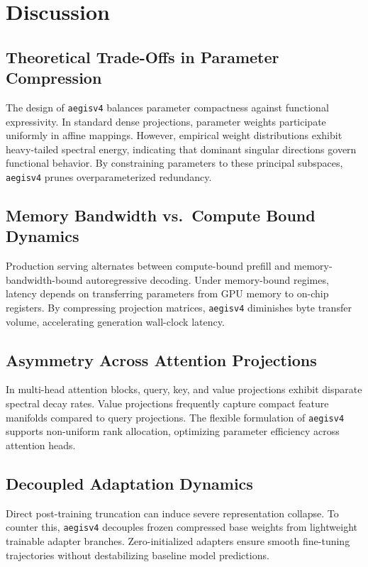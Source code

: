 \section{Discussion}

\subsection{Theoretical Trade-Offs in Parameter Compression}
The design of \texttt{aegisv4} balances parameter compactness against functional expressivity. In standard dense projections, parameter weights participate uniformly in affine mappings. However, empirical weight distributions exhibit heavy-tailed spectral energy, indicating that dominant singular directions govern functional behavior. By constraining parameters to these principal subspaces, \texttt{aegisv4} prunes overparameterized redundancy.

\subsection{Memory Bandwidth vs.\ Compute Bound Dynamics}
Production serving alternates between compute-bound prefill and memory-bandwidth-bound autoregressive decoding. Under memory-bound regimes, latency depends on transferring parameters from GPU memory to on-chip registers. By compressing projection matrices, \texttt{aegisv4} diminishes byte transfer volume, accelerating generation wall-clock latency.

\subsection{Asymmetry Across Attention Projections}
In multi-head attention blocks, query, key, and value projections exhibit disparate spectral decay rates. Value projections frequently capture compact feature manifolds compared to query projections. The flexible formulation of \texttt{aegisv4} supports non-uniform rank allocation, optimizing parameter efficiency across attention heads.

\subsection{Decoupled Adaptation Dynamics}
Direct post-training truncation can induce severe representation collapse. To counter this, \texttt{aegisv4} decouples frozen compressed base weights from lightweight trainable adapter branches. Zero-initialized adapters ensure smooth fine-tuning trajectories without destabilizing baseline model predictions.

